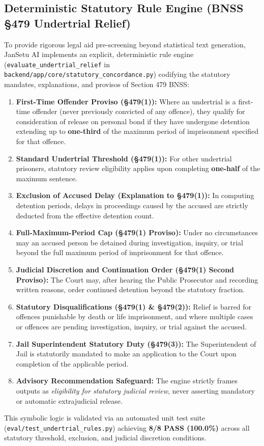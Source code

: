 \documentclass[12pt,a4paper,oneside]{report}
\begin{document}
\subsection{Deterministic Statutory Rule Engine (BNSS \S 479 Undertrial Relief)}
To provide rigorous legal aid pre-screening beyond statistical text generation, JanSetu AI implements an explicit, deterministic rule engine (\texttt{evaluate\_undertrial\_relief} in \texttt{backend/app/core/statutory\_concordance.py}) codifying the statutory mandates, explanations, and provisos of Section 479 BNSS:
\begin{enumerate}[itemsep=2pt]
    \item \textbf{First-Time Offender Proviso (\S 479(1)):} Where an undertrial is a first-time offender (never previously convicted of any offence), they qualify for consideration of release on personal bond if they have undergone detention extending up to \textbf{one-third} of the maximum period of imprisonment specified for that offence.
    \item \textbf{Standard Undertrial Threshold (\S 479(1)):} For other undertrial prisoners, statutory review eligibility applies upon completing \textbf{one-half} of the maximum sentence.
    \item \textbf{Exclusion of Accused Delay (Explanation to \S 479(1)):} In computing detention periods, delays in proceedings caused by the accused are strictly deducted from the effective detention count.
    \item \textbf{Full-Maximum-Period Cap (\S 479(1) Proviso):} Under no circumstances may an accused person be detained during investigation, inquiry, or trial beyond the full maximum period of imprisonment for that offence.
    \item \textbf{Judicial Discretion and Continuation Order (\S 479(1) Second Proviso):} The Court may, after hearing the Public Prosecutor and recording written reasons, order continued detention beyond the statutory fraction.
    \item \textbf{Statutory Disqualifications (\S 479(1) \& \S 479(2)):} Relief is barred for offences punishable by death or life imprisonment, and where multiple cases or offences are pending investigation, inquiry, or trial against the accused.
    \item \textbf{Jail Superintendent Statutory Duty (\S 479(3)):} The Superintendent of Jail is statutorily mandated to make an application to the Court upon completion of the applicable period.
    \item \textbf{Advisory Recommendation Safeguard:} The engine strictly frames outputs as \textit{eligibility for statutory judicial review}, never asserting mandatory or automatic extrajudicial release.
\end{enumerate}
This symbolic logic is validated via an automated unit test suite (\texttt{eval/test\_undertrial\_rules.py}) achieving \textbf{8/8 PASS (100.0\%)} across all statutory threshold, exclusion, and judicial discretion conditions.
\end{document}
